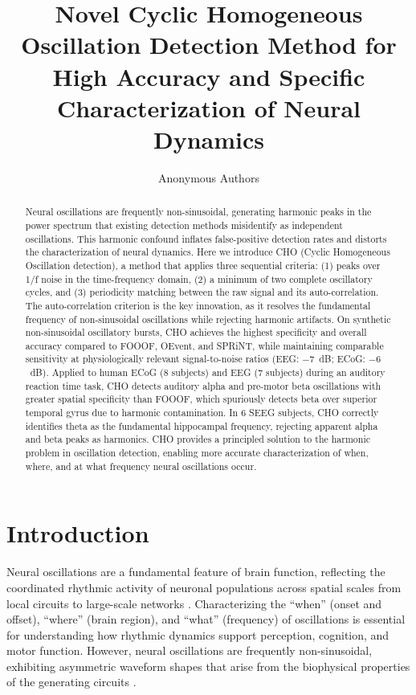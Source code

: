 \documentclass[12pt]{article}
\title{Novel Cyclic Homogeneous Oscillation Detection Method for High Accuracy and Specific Characterization of Neural Dynamics}
\author{Anonymous Authors}
\date{}
\begin{document}
\maketitle

\begin{abstract}
Neural oscillations are frequently non-sinusoidal, generating harmonic peaks in the power spectrum that existing detection methods misidentify as independent oscillations. This harmonic confound inflates false-positive detection rates and distorts the characterization of neural dynamics. Here we introduce CHO (Cyclic Homogeneous Oscillation detection), a method that applies three sequential criteria: (1) peaks over 1/f noise in the time-frequency domain, (2) a minimum of two complete oscillatory cycles, and (3) periodicity matching between the raw signal and its auto-correlation. The auto-correlation criterion is the key innovation, as it resolves the fundamental frequency of non-sinusoidal oscillations while rejecting harmonic artifacts. On synthetic non-sinusoidal oscillatory bursts, CHO achieves the highest specificity and overall accuracy compared to FOOOF, OEvent, and SPRiNT, while maintaining comparable sensitivity at physiologically relevant signal-to-noise ratios (EEG: $-7$~dB; ECoG: $-6$~dB). Applied to human ECoG (8 subjects) and EEG (7 subjects) during an auditory reaction time task, CHO detects auditory alpha and pre-motor beta oscillations with greater spatial specificity than FOOOF, which spuriously detects beta over superior temporal gyrus due to harmonic contamination. In 6 SEEG subjects, CHO correctly identifies theta as the fundamental hippocampal frequency, rejecting apparent alpha and beta peaks as harmonics. CHO provides a principled solution to the harmonic problem in oscillation detection, enabling more accurate characterization of when, where, and at what frequency neural oscillations occur.
\end{abstract}

\section{Introduction}

Neural oscillations are a fundamental feature of brain function, reflecting the coordinated rhythmic activity of neuronal populations across spatial scales from local circuits to large-scale networks \citep{buzsaki2004neuronal, engel2001dynamic}. Characterizing the ``when'' (onset and offset), ``where'' (brain region), and ``what'' (frequency) of oscillations is essential for understanding how rhythmic dynamics support perception, cognition, and motor function. However, neural oscillations are frequently non-sinusoidal, exhibiting asymmetric waveform shapes that arise from the biophysical properties of the generating circuits \citep{cole2017nonsinusoidal}.
\end{document}
